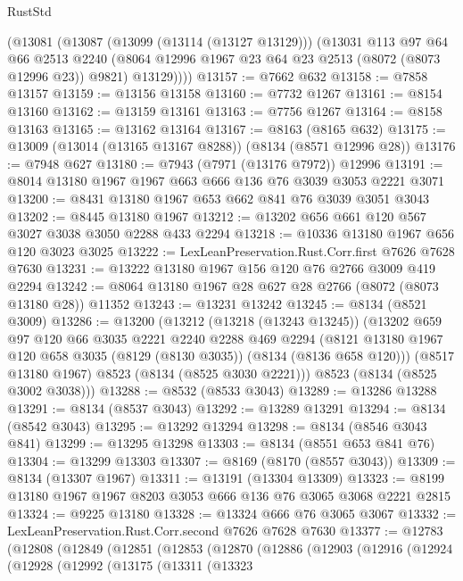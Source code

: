 \begin{lexlean}{RustStd}
\begin{coremodule}
{\begin{coremodule}
{{{{{{{{{{{{{{{{{{{{{{{{{{{{{{{{{{{{{{{{{{{{{{{{{{{{{      (@13081
        (@13087
          (@13099 (@13114 (@13127 @13129)))
          (@13031
            @113
            @97
            @64
            @66
            @2513
            @2240
            (@8064 @12996 @1967 @23 @64 @23 @2513 (@8072 (@8073 @12996 @23)) @9821)
            @13129))))
@13157 := @7662 @632
@13158 := @7858 @13157
@13159 := @13156 @13158
@13160 := @7732 @1267
@13161 := @8154 @13160
@13162 := @13159 @13161
@13163 := @7756 @1267
@13164 := @8158 @13163
@13165 := @13162 @13164
@13167 := @8163 (@8165 @632)
@13175 := @13009 (@13014 (@13165 @13167 @8288)) (@8134 (@8571 @12996 @28))
@13176 := @7948 @627
@13180 := @7943 (@7971 (@13176 @7972)) @12996
@13191 := @8014 @13180 @1967 @1967 @663 @666 @136 @76 @3039 @3053 @2221 @3071
@13200 := @8431 @13180 @1967 @653 @662 @841 @76 @3039 @3051 @3043
@13202 := @8445 @13180 @1967
@13212 := @13202 @656 @661 @120 @567 @3027 @3038 @3050 @2288 @433 @2294
@13218 := @10336 @13180 @1967 @656 @120 @3023 @3025
@13222 := LexLeanPreservation.Rust.Corr.first @7626 @7628 @7630
@13231 := @13222 @13180 @1967 @156 @120 @76 @2766 @3009 @419 @2294
@13242 := @8064 @13180 @1967 @28 @627 @28 @2766 (@8072 (@8073 @13180 @28)) @11352
@13243 := @13231 @13242
@13245 := @8134 (@8521 @3009)
@13286 := @13200
    (@13212
      (@13218 (@13243 @13245))
      (@13202
        @659
        @97
        @120
        @66
        @3035
        @2221
        @2240
        @2288
        @469
        @2294
        (@8121 @13180 @1967 @120 @658 @3035 (@8129 (@8130 @3035)) (@8134 (@8136 @658 @120)))
        (@8517 @13180 @1967)
        @8523
        (@8134 (@8525 @3030 @2221)))
      @8523
      (@8134 (@8525 @3002 @3038)))
@13288 := @8532 (@8533 @3043)
@13289 := @13286 @13288
@13291 := @8134 (@8537 @3043)
@13292 := @13289 @13291
@13294 := @8134 (@8542 @3043)
@13295 := @13292 @13294
@13298 := @8134 (@8546 @3043 @841)
@13299 := @13295 @13298
@13303 := @8134 (@8551 @653 @841 @76)
@13304 := @13299 @13303
@13307 := @8169 (@8170 (@8557 @3043))
@13309 := @8134 (@13307 @1967)
@13311 := @13191 (@13304 @13309)
@13323 := @8199 @13180 @1967 @1967 @8203 @3053 @666 @136 @76 @3065 @3068 @2221 @2815
@13324 := @9225 @13180
@13328 := @13324 @666 @76 @3065 @3067
@13332 := LexLeanPreservation.Rust.Corr.second @7626 @7628 @7630
@13377 := @12783
    (@12808
      (@12849
        (@12851
          (@12853
            (@12870
              (@12886
                (@12903
                  (@12916
                    (@12924
                      (@12928
                        (@12992
                          (@13175
                            (@13311
                              (@13323
}}}}}}}}}}}}}}}}}}}}}}}}}}}}}}}}}}}}}}}}}}}}}}}}}}}}}
\end{coremodule}}
\end{coremodule}
\end{lexlean}
